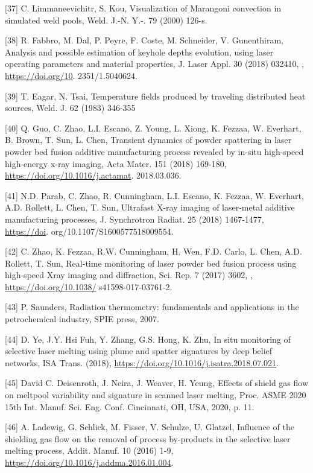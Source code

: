 \documentclass[10pt]{article}
\begin{document}
[37] C. Limmaneevichitr, S. Kou, Visualization of Marangoni convection in simulated weld pools, Weld. J.-N. Y.-. 79 (2000) 126-s.

[38] R. Fabbro, M. Dal, P. Peyre, F. Coste, M. Schneider, V. Gunenthiram, Analysis and possible estimation of keyhole depths evolution, using laser operating parameters and material properties, J. Laser Appl. 30 (2018) 032410, , \href{https://doi.org/10}{https://doi.org/10}. 2351/1.5040624.

[39] T. Eagar, N. Tsai, Temperature fields produced by traveling distributed heat sources, Weld. J. 62 (1983) 346-355

[40] Q. Guo, C. Zhao, L.I. Escano, Z. Young, L. Xiong, K. Fezzaa, W. Everhart, B. Brown, T. Sun, L. Chen, Transient dynamics of powder spattering in laser powder bed fusion additive manufacturing process revealed by in-situ high-speed high-energy x-ray imaging, Acta Mater. 151 (2018) 169-180, \href{https://doi.org/10.1016/j.actamat}{https://doi.org/10.1016/j.actamat}. 2018.03.036.

[41] N.D. Parab, C. Zhao, R. Cunningham, L.I. Escano, K. Fezzaa, W. Everhart, A.D. Rollett, L. Chen, T. Sun, Ultrafast X-ray imaging of laser-metal additive manufacturing processes, J. Synchrotron Radiat. 25 (2018) 1467-1477, \href{https://doi}{https://doi}. org/10.1107/S1600577518009554.

[42] C. Zhao, K. Fezzaa, R.W. Cunningham, H. Wen, F.D. Carlo, L. Chen, A.D. Rollett, T. Sun, Real-time monitoring of laser powder bed fusion process using high-speed Xray imaging and diffraction, Sci. Rep. 7 (2017) 3602, , \href{https://doi.org/10.1038/}{https://doi.org/10.1038/} s41598-017-03761-2.

[43] P. Saunders, Radiation thermometry: fundamentals and applications in the petrochemical industry, SPIE press, 2007.

[44] D. Ye, J.Y. Hsi Fuh, Y. Zhang, G.S. Hong, K. Zhu, In situ monitoring of selective laser melting using plume and spatter signatures by deep belief networks, ISA Trans. (2018), \href{https://doi.org/10.1016/j.isatra.2018.07.021}{https://doi.org/10.1016/j.isatra.2018.07.021}.

[45] David C. Deisenroth, J. Neira, J. Weaver, H. Yeung, Effects of shield gas flow on meltpool variability and signature in scanned laser melting, Proc. ASME 2020 15th Int. Manuf. Sci. Eng. Conf. Cincinnati, OH, USA, 2020, p. 11.

[46] A. Ladewig, G. Schlick, M. Fisser, V. Schulze, U. Glatzel, Influence of the shielding gas flow on the removal of process by-products in the selective laser melting process, Addit. Manuf. 10 (2016) 1-9, \href{https://doi.org/10.1016/j.addma.2016.01.004}{https://doi.org/10.1016/j.addma.2016.01.004}.
\end{document}
